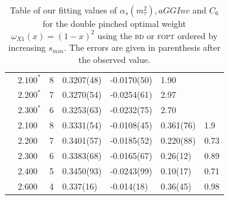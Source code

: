 \documentclass[../../index.tex]{subfiles}
\begin{document}
\begin{table}
\begin{tabular}{lllllll}
    \parbox[t]{2mm}{} & \(2.100^*\) & 8 & 0.3207(48) & -0.0170(50) & 1.90 \\
    & \(2.200^*\) & 7 & 0.3270(54) & -0.0254(61) & 2.97 \\
    & \(2.300^*\) & 6 & 0.3253(63) & -0.0232(75) & 2.70 \\
    \midrule
    \parbox[t]{2mm}{} & 2.100 & 8 & 0.3331(54) & -0.0108(45) & 0.361(76) & 1.9 \\
    & 2.200 & 7  & 0.3401(57) & -0.0185(52) & 0.220(88) & 0.73 \\
    & 2.300 & 6  & 0.3383(68) & -0.0165(67) & 0.26(12) & 0.89 \\
    & 2.400 & 5  & 0.3450(93) & -0.0243(99) & 0.10(17) & 0.71 \\
    & 2.600 & 4  & 0.337(16) & -0.014(18) & 0.36(45) & 0.98 \\
    \bottomrule
  \end{tabular}
  \caption{Table of our fitting values of \(\alpha_s(m_\tau^2), aGGInv\) and
    \(C_{6}\) for the double pinched optimal weight \(\omega_{X1}(x)=(1-x)^2\)
    using the \textsc{bd} or \textsc{fopt} ordered by increasing \(s_{min}\). The errors are given
    in parenthesis after the observed value.}
  \label{table:fitOpt30AlD4D6}
\end{table}
\end{document}
